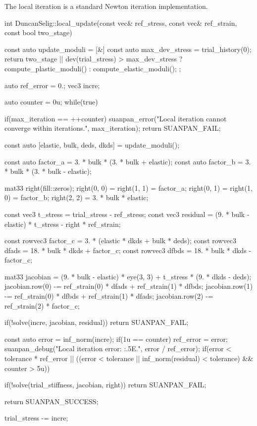 The local iteration is a standard Newton iteration implementation.
\begin{cppcode}
int DuncanSelig::local_update(const vec& ref_stress, const vec& ref_strain, const bool two_stage) {
    const auto update_moduli = [&] {
        const auto max_dev_stress = trial_history(0);
        return two_stage || dev(trial_stress) > max_dev_stress ? compute_plastic_moduli() : compute_elastic_moduli();
    };

    auto ref_error = 0.;
    vec3 incre;

    auto counter = 0u;
    while(true) {
        if(max_iteration == ++counter) {
            suanpan_error("Local iteration cannot converge within {} iterations.\n", max_iteration);
            return SUANPAN_FAIL;
        }

        const auto [elastic, bulk, deds, dkds] = update_moduli();

        const auto factor_a = 3. * bulk * (3. * bulk + elastic);
        const auto factor_b = 3. * bulk * (3. * bulk - elastic);

        mat33 right(fill::zeros);
        right(0, 0) = right(1, 1) = factor_a;
        right(0, 1) = right(1, 0) = factor_b;
        right(2, 2) = 3. * bulk * elastic;

        const vec3 t_stress = trial_stress - ref_stress;
        const vec3 residual = (9. * bulk - elastic) * t_stress - right * ref_strain;

        const rowvec3 factor_c = 3. * (elastic * dkds + bulk * deds);
        const rowvec3 dfads = 18. * bulk * dkds + factor_c;
        const rowvec3 dfbds = 18. * bulk * dkds - factor_c;

        mat33 jacobian = (9. * bulk - elastic) * eye(3, 3) + t_stress * (9. * dkds - deds);
        jacobian.row(0) -= ref_strain(0) * dfads + ref_strain(1) * dfbds;
        jacobian.row(1) -= ref_strain(0) * dfbds + ref_strain(1) * dfads;
        jacobian.row(2) -= ref_strain(2) * factor_c;

        if(!solve(incre, jacobian, residual)) return SUANPAN_FAIL;

        const auto error = inf_norm(incre);
        if(1u == counter) ref_error = error;
        suanpan_debug("Local iteration error: {:.5E}.\n", error / ref_error);
        if(error < tolerance * ref_error || ((error < tolerance || inf_norm(residual) < tolerance) && counter > 5u)) {
            if(!solve(trial_stiffness, jacobian, right)) return SUANPAN_FAIL;

            return SUANPAN_SUCCESS;
        }

        trial_stress -= incre;
    }
}
\end{cppcode}

